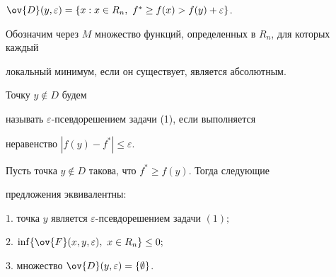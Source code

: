 $\ov{D}(y,\varepsilon)=\{x:x\in R_n,\ f^*\ge f(x)>f(y)+\varepsilon\}$.


Обозначим через $M$ множество функций, определенных в $R_n$, для которых каждый 


локальный минимум, если он существует, является абсолютным.





\begin{defn}


Точку $y{\notin}D$ будем


называть $\varepsilon$-псевдорешением задачи (1), если выполняется


неравенство $|f(y)-f^*|\le \varepsilon$.


\end{defn}





\begin{lem} 


Пусть точка $y\notin D$ такова, что $f^*\ge f(y)$. Тогда следующие


предложения эквивалентны$:$





$1.$ точка $y$ является $\varepsilon$-псевдорешением задачи $(1);$





$2.$ $\inf\{\ov{F}(x,y,\varepsilon),\ x\in R_n\}\le 0;$





$3.$ множество $\ov{D}(y,\varepsilon)=\{\emptyset\}$.


\end{lem}






